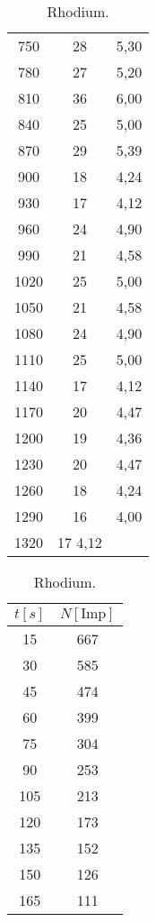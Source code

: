\begin{table}
\begin{minipage}{.5\linewidth}
\begin{tabular}{c c c}
        750   & 28  & 5{,}30\\
        780   & 27  & 5{,}20\\
        810   & 36  & 6{,}00\\
        840   & 25  & 5{,}00\\
        870   & 29  & 5{,}39\\
        900   & 18  & 4{,}24\\
        930   & 17  & 4{,}12\\
        960   & 24  & 4{,}90\\
        990   & 21  & 4{,}58\\
        1020  & 25  & 5{,}00\\
        1050  & 21  & 4{,}58\\
        1080  & 24  & 4{,}90\\
        1110  & 25  & 5{,}00\\
        1140  & 17  & 4{,}12\\
        1170  & 20  & 4{,}47\\
        1200  & 19  & 4{,}36\\
        1230  & 20  & 4{,}47\\
        1260  & 18  & 4{,}24\\
        1290  & 16  & 4{,}00\\
        1320  & 17 4{,}12\\
            \bottomrule
        \end{tabular}
    \end{minipage}
    \begin{minipage}{.5\linewidth}
        \centering
            \caption{Rhodium.}
            \label{tab:Rhodium}
            \begin{tabular}{c c}
            \toprule   
             $t[s]$ & $N [\text{Imp}]$ \\
            \midrule
            15	 & 667 \\
            30	 & 585 \\	 
            45	 & 474 \\
            60	 & 399 \\
            75	 & 304 \\
            90	 & 253 \\
            105	 & 213 \\
            120	 & 173 \\
            135	 & 152 \\
            150	 & 126 \\
            165	 & 111 \\

\end{tabular}
\end{minipage}
\end{table}
